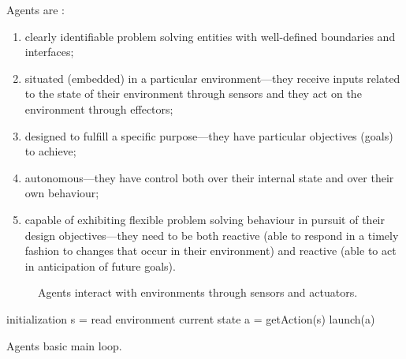\documentclass[11pt,oneside,a4paper,openright]{report}
\begin{document}
Agents are \cite{WooldridgeJennings1995}:
\begin{enumerate}[i-]
 \item clearly identifiable problem solving entities with well-defined boundaries and
interfaces;
\item situated (embedded) in a particular environment—they receive inputs related to the
state of their environment through sensors and they act on the environment through
effectors;
\item designed to fulfill a specific purpose—they have particular objectives (goals) to
achieve;
\item autonomous—they have control both over their internal state and over their own
behaviour;
\item capable of exhibiting flexible problem solving behaviour in pursuit of their design
objectives—they need to be both reactive (able to respond in a timely fashion to
changes that occur in their environment) and reactive (able to act in anticipation of
future goals).
\end{enumerate}


	\begin{figure}[h]
	\centering
	\setlength\fboxsep{0pt}
	\setlength\fboxrule{0.5pt}
	\caption{Agents interact with environments through sensors and actuators.}
	\label{fig:SimTL}
	\end{figure}


 	\begin{algorithm}[H]
	\SetAlgoSkip{} 
	\SetAlgoLined
	initialization\;
	{
		s = read environment current state\;
		a = getAction(s)\;
		launch(a)\;
	}
	\caption{Agents basic main loop.}
	\end{algorithm}
\end{document}
